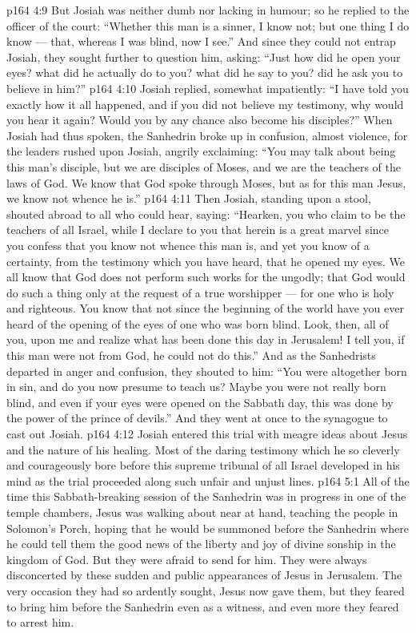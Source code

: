 \vs p164 4:9 But Josiah was neither dumb nor lacking in humour; so he replied to the officer of the court: “Whether this man is a sinner, I know not; but one thing I do know --- that, whereas I was blind, now I see.” And since they could not entrap Josiah, they sought further to question him, asking: “Just how did he open your eyes? what did he actually do to you? what did he say to you? did he ask you to believe in him?”
\vs p164 4:10 Josiah replied, somewhat impatiently: “I have told you exactly how it all happened, and if you did not believe my testimony, why would you hear it again? Would you by any chance also become his disciples?” When Josiah had thus spoken, the Sanhedrin broke up in confusion, almost violence, for the leaders rushed upon Josiah, angrily exclaiming: “You may talk about being this man’s disciple, but we are disciples of Moses, and we are the teachers of the laws of God. We know that God spoke through Moses, but as for this man Jesus, we know not whence he is.”
\vs p164 4:11 Then Josiah, standing upon a stool, shouted abroad to all who could hear, saying: “Hearken, you who claim to be the teachers of all Israel, while I declare to you that herein is a great marvel since you confess that you know not whence this man is, and yet you know of a certainty, from the testimony which you have heard, that he opened my eyes. We all know that God does not perform such works for the ungodly; that God would do such a thing only at the request of a true worshipper --- for one who is holy and righteous. You know that not since the beginning of the world have you ever heard of the opening of the eyes of one who was born blind. Look, then, all of you, upon me and realize what has been done this day in Jerusalem! I tell you, if this man were not from God, he could not do this.” And as the Sanhedrists departed in anger and confusion, they shouted to him: “You were altogether born in sin, and do you now presume to teach us? Maybe you were not really born blind, and even if your eyes were opened on the Sabbath day, this was done by the power of the prince of devils.” And they went at once to the synagogue to cast out Josiah.
\vs p164 4:12 Josiah entered this trial with meagre ideas about Jesus and the nature of his healing. Most of the daring testimony which he so cleverly and courageously bore before this supreme tribunal of all Israel developed in his mind as the trial proceeded along such unfair and unjust lines.
\vs p164 5:1 All of the time this Sabbath\hyp{}breaking session of the Sanhedrin was in progress in one of the temple chambers, Jesus was walking about near at hand, teaching the people in Solomon’s Porch, hoping that he would be summoned before the Sanhedrin where he could tell them the good news of the liberty and joy of divine sonship in the kingdom of God. But they were afraid to send for him. They were always disconcerted by these sudden and public appearances of Jesus in Jerusalem. The very occasion they had so ardently sought, Jesus now gave them, but they feared to bring him before the Sanhedrin even as a witness, and even more they feared to arrest him.
